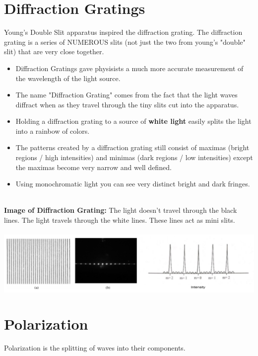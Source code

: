 \documentclass{article}
\begin{document}
\section{Diffraction Gratings}
Young's Double Slit apparatus inspired the diffraction grating. The diffraction grating is a series of NUMEROUS slits (not just the two from young's "double" slit) that are very close together.\\
\begin{itemize}
    \item Diffraction Gratings gave physisists a much more accurate measurement of the wavelength of the light source.
    \item The name "Diffraction Grating" comes from the fact that the light waves diffract when as they travel through the tiny slits cut into the apparatus.
    \item Holding a diffraction grating to a source of \textbf{white light} easily splits the light into a rainbow of colors.
    \item The patterns created by a diffraction grating still consist of maximas (bright regions / high intensities) and minimas (dark regions / low intensities) except the maximas become very narrow and well defined.
    \item Using monochromatic light you can see very distinct bright and dark fringes.
\end{itemize}\leavevmode\\
\noindent\textbf{Image of Diffraction Grating:}
The light doesn't travel through the black lines. The light travels through the white lines. These lines act as mini slits.\\\\
\includegraphics[scale=0.4]{images/diffraction_grating} \\
\vspace{5cm}
\section{Polarization}
Polarization is the splitting of waves into their components.
\end{document}
